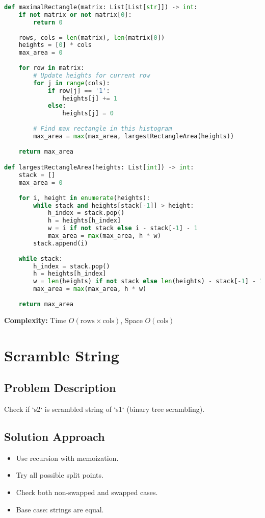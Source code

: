 \documentclass[10pt, a4paper]{article}
\begin{document}
\begin{lstlisting}[language=Python]
def maximalRectangle(matrix: List[List[str]]) -> int:
    if not matrix or not matrix[0]:
        return 0
    
    rows, cols = len(matrix), len(matrix[0])
    heights = [0] * cols
    max_area = 0
    
    for row in matrix:
        # Update heights for current row
        for j in range(cols):
            if row[j] == '1':
                heights[j] += 1
            else:
                heights[j] = 0
        
        # Find max rectangle in this histogram
        max_area = max(max_area, largestRectangleArea(heights))
    
    return max_area

def largestRectangleArea(heights: List[int]) -> int:
    stack = []
    max_area = 0
    
    for i, height in enumerate(heights):
        while stack and heights[stack[-1]] > height:
            h_index = stack.pop()
            h = heights[h_index]
            w = i if not stack else i - stack[-1] - 1
            max_area = max(max_area, h * w)
        stack.append(i)
    
    while stack:
        h_index = stack.pop()
        h = heights[h_index]
        w = len(heights) if not stack else len(heights) - stack[-1] - 1
        max_area = max(max_area, h * w)
    
    return max_area
\end{lstlisting}
\textbf{Complexity:} Time $O(\text{rows} \times \text{cols})$, Space $O(\text{cols})$

\section{Scramble String}
\subsection*{Problem Description}
Check if `s2` is scrambled string of `s1` (binary tree scrambling).

\subsection*{Solution Approach}
\begin{itemize}
    \item Use recursion with memoization.
    \item Try all possible split points.
    \item Check both non-swapped and swapped cases.
    \item Base case: strings are equal.
\end{itemize}
\end{document}
